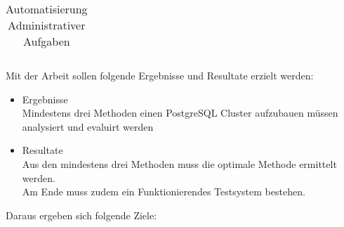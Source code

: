\begin{landscape}
\begin{table}[H]
{\begin{tabular}{@{}lllllll@{}}
\end{tabular}%
}
\caption{Automatisierung Administrativer Aufgaben}
\label{tab:automatgisierung_administrative_aufgaben}
\end{table}
\begin{flushleft}
Mit der Arbeit sollen folgende Ergebnisse und Resultate erzielt werden:
\begin{itemize}
    \item Ergebnisse \\ Mindestens drei Methoden einen \Gls{PostgreSQL Cluster} aufzubauen müssen analysiert und evaluirt werden
    \item Resultate \\ Aus den mindestens drei Methoden muss die optimale Methode ermittelt werden. \\ Am Ende muss zudem ein Funktionierendes Testsystem bestehen.
\end{itemize}
\end{flushleft}
\begin{flushleft}
Daraus ergeben sich folgende Ziele:
\end{flushleft}
\begin{table}[H]
\end{table}
\end{landscape}
